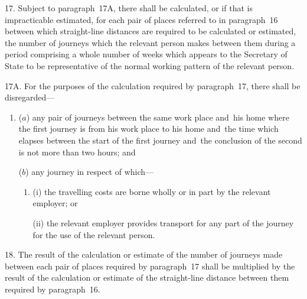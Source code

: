 \documentclass[12pt,a4paper]{article}
\begin{document}

17.  Subject to paragraph~17A, there shall be calculated, or if that is impracticable estimated, for each pair of places referred to in paragraph~16 between which straight-line distances are required to be calculated or estimated, the number of journeys which the relevant person makes between them during a period comprising a whole number of weeks which appears to the 
Secretary of State  %
to be representative of the normal working pattern of the relevant person.


\medskip

17A.  For the purposes of the calculation required by paragraph~17, there shall be disregarded—
\begin{enumerate}\item[]
($a$) any pair of journeys between the same work place and~his home where the first journey is from his work place to his home and~the time which elapses between the start of the first journey and~the conclusion of the second is not more than two hours; and

($b$) any journey in respect of which—
\begin{enumerate}\item[]
(i) the travelling costs are borne wholly or in part by the relevant employer; or

(ii) the relevant employer provides transport for any part of the journey for the use of the relevant person.
\end{enumerate}
\end{enumerate}


\medskip

18.  The result of the calculation or estimate of the number of journeys made between each pair of places required by paragraph~17 shall be multiplied by the result of the calculation or estimate of the straight-line distance between them required by paragraph~16.
\end{document}
